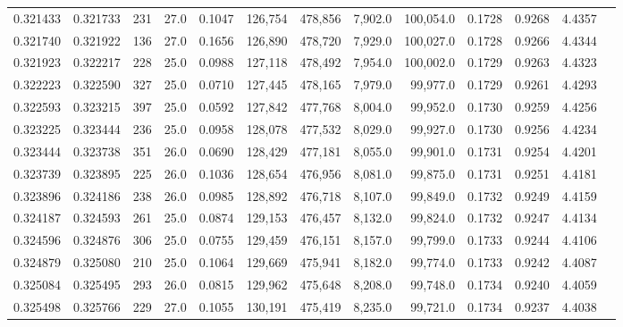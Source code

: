 \begin{tabular}{rrrrrrrrrrrrr}
0.321433 & 0.321733 &   231 & 27.0 &                                     0.1047 & 126,754 & 478,856 &   7,902.0 & 100,054.0 & 0.1728 & 0.9268 & 4.4357 \\
0.321740 & 0.321922 &   136 & 27.0 &                                     0.1656 & 126,890 & 478,720 &   7,929.0 & 100,027.0 & 0.1728 & 0.9266 & 4.4344 \\
0.321923 & 0.322217 &   228 & 25.0 &                                     0.0988 & 127,118 & 478,492 &   7,954.0 & 100,002.0 & 0.1729 & 0.9263 & 4.4323 \\
0.322223 & 0.322590 &   327 & 25.0 &                                     0.0710 & 127,445 & 478,165 &   7,979.0 &  99,977.0 & 0.1729 & 0.9261 & 4.4293 \\
0.322593 & 0.323215 &   397 & 25.0 &                                     0.0592 & 127,842 & 477,768 &   8,004.0 &  99,952.0 & 0.1730 & 0.9259 & 4.4256 \\
0.323225 & 0.323444 &   236 & 25.0 &                                     0.0958 & 128,078 & 477,532 &   8,029.0 &  99,927.0 & 0.1730 & 0.9256 & 4.4234 \\
0.323444 & 0.323738 &   351 & 26.0 &                                     0.0690 & 128,429 & 477,181 &   8,055.0 &  99,901.0 & 0.1731 & 0.9254 & 4.4201 \\
0.323739 & 0.323895 &   225 & 26.0 &                                     0.1036 & 128,654 & 476,956 &   8,081.0 &  99,875.0 & 0.1731 & 0.9251 & 4.4181 \\
0.323896 & 0.324186 &   238 & 26.0 &                                     0.0985 & 128,892 & 476,718 &   8,107.0 &  99,849.0 & 0.1732 & 0.9249 & 4.4159 \\
0.324187 & 0.324593 &   261 & 25.0 &                                     0.0874 & 129,153 & 476,457 &   8,132.0 &  99,824.0 & 0.1732 & 0.9247 & 4.4134 \\
0.324596 & 0.324876 &   306 & 25.0 &                                     0.0755 & 129,459 & 476,151 &   8,157.0 &  99,799.0 & 0.1733 & 0.9244 & 4.4106 \\
0.324879 & 0.325080 &   210 & 25.0 &                                     0.1064 & 129,669 & 475,941 &   8,182.0 &  99,774.0 & 0.1733 & 0.9242 & 4.4087 \\
0.325084 & 0.325495 &   293 & 26.0 &                                     0.0815 & 129,962 & 475,648 &   8,208.0 &  99,748.0 & 0.1734 & 0.9240 & 4.4059 \\
0.325498 & 0.325766 &   229 & 27.0 &                                     0.1055 & 130,191 & 475,419 &   8,235.0 &  99,721.0 & 0.1734 & 0.9237 & 4.4038 \\

\end{tabular}
